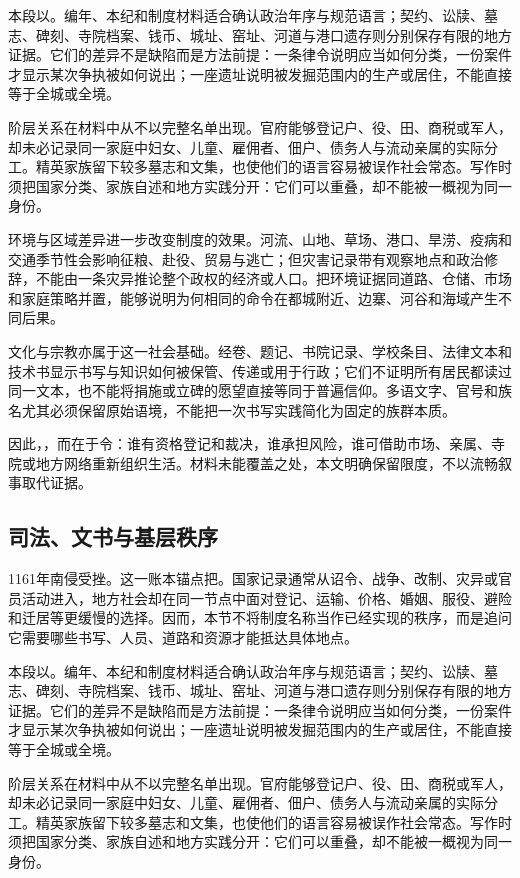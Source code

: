 本段以。编年、本纪和制度材料适合确认政治年序与规范语言；契约、讼牍、墓志、碑刻、寺院档案、钱币、城址、窑址、河道与港口遗存则分别保存有限的地方证据。它们的差异不是缺陷而是方法前提：一条律令说明应当如何分类，一份案件才显示某次争执被如何说出；一座遗址说明被发掘范围内的生产或居住，不能直接等于全城或全境。

阶层关系在材料中从不以完整名单出现。官府能够登记户、役、田、商税或军人，却未必记录同一家庭中妇女、儿童、雇佣者、佃户、债务人与流动亲属的实际分工。精英家族留下较多墓志和文集，也使他们的语言容易被误作社会常态。写作时须把国家分类、家族自述和地方实践分开：它们可以重叠，却不能被一概视为同一身份。

环境与区域差异进一步改变制度的效果。河流、山地、草场、港口、旱涝、疫病和交通季节性会影响征粮、赴役、贸易与逃亡；但灾害记录带有观察地点和政治修辞，不能由一条灾异推论整个政权的经济或人口。把环境证据同道路、仓储、市场和家庭策略并置，能够说明为何相同的命令在都城附近、边寨、河谷和海域产生不同后果。

文化与宗教亦属于这一社会基础。经卷、题记、书院记录、学校条目、法律文本和技术书显示书写与知识如何被保管、传递或用于行政；它们不证明所有居民都读过同一文本，也不能将捐施或立碑的愿望直接等同于普遍信仰。多语文字、官号和族名尤其必须保留原始语境，不能把一次书写实践简化为固定的族群本质。

因此，，而在于令：谁有资格登记和裁决，谁承担风险，谁可借助市场、亲属、寺院或地方网络重新组织生活。材料未能覆盖之处，本文明确保留限度，不以流畅叙事取代证据。

\subsection{司法、文书与基层秩序}

1161年南侵受挫。这一账本锚点把。国家记录通常从诏令、战争、改制、灾异或官员活动进入，地方社会却在同一节点中面对登记、运输、价格、婚姻、服役、避险和迁居等更缓慢的选择。因而，本节不将制度名称当作已经实现的秩序，而是追问它需要哪些书写、人员、道路和资源才能抵达具体地点。

本段以。编年、本纪和制度材料适合确认政治年序与规范语言；契约、讼牍、墓志、碑刻、寺院档案、钱币、城址、窑址、河道与港口遗存则分别保存有限的地方证据。它们的差异不是缺陷而是方法前提：一条律令说明应当如何分类，一份案件才显示某次争执被如何说出；一座遗址说明被发掘范围内的生产或居住，不能直接等于全城或全境。

阶层关系在材料中从不以完整名单出现。官府能够登记户、役、田、商税或军人，却未必记录同一家庭中妇女、儿童、雇佣者、佃户、债务人与流动亲属的实际分工。精英家族留下较多墓志和文集，也使他们的语言容易被误作社会常态。写作时须把国家分类、家族自述和地方实践分开：它们可以重叠，却不能被一概视为同一身份。

